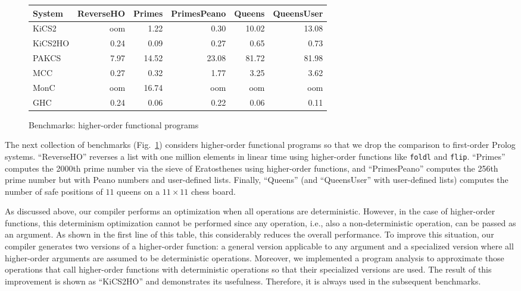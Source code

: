 \documentclass{llncs}
\newcommand{\code}[1]{\mbox{\small\texttt{#1}}}
\begin{document}
\begin{figure}
\centering
\begin{tabular}{|@{~~}l@{~~}|*{5}{@{~~}r@{~~}|}}
\hline
System  & ReverseHO & Primes & PrimesPeano & Queens & QueensUser \\\hline
KiCS2   &      oom  &   1.22 &       0.30  &  10.02 &     13.08  \\
KiCS2HO &     0.24  &   0.09 &       0.27  &   0.65 &      0.73  \\
PAKCS   &     7.97  &  14.52 &      23.08  &  81.72 &     81.98  \\
MCC     &     0.27  &   0.32 &       1.77  &   3.25 &      3.62  \\
MonC    &      oom  &  16.74 &        oom  &    oom &       oom  \\
GHC     &     0.24  &   0.06 &       0.22  &   0.06 &      0.11  \\
\hline
\end{tabular}
\caption{Benchmarks: higher-order functional programs}
 \label{fig:bench-higher-order}
\end{figure}
%
The next collection of benchmarks (Fig.~\ref{fig:bench-higher-order})
considers higher-order functional programs so that we drop
the comparison to first-order Prolog systems.
``ReverseHO'' reverses a list with one million
elements in linear time using higher-order functions
like \code{foldl} and \code{flip}.
``Primes'' computes the 2000th prime number via the
sieve of Eratosthenes using higher-order functions,
and ``PrimesPeano'' computes the 256th prime number but
with Peano numbers and user-defined lists.
Finally, ``Queens'' (and ``QueensUser'' with user-defined lists)
computes the number of safe positions of $11$ queens on a $11 \times 11$
chess board.

As discussed above, our compiler performs an optimization
when all operations are deterministic. However, in the case
of higher-order functions, this determinism optimization cannot be performed
since any operation, i.e., also a non-deterministic operation,
can be passed as an argument. As shown in the first line of this table,
this considerably reduces the overall performance.
To improve this situation, our compiler generates two versions
of a higher-order function: a general version applicable to any
argument and a specialized version where all higher-order arguments
are assumed to be deterministic operations.
Moreover, we implemented a program analysis
to approximate those operations that call higher-order functions
with deterministic operations so that their specialized versions
are used. The result of this improvement
is shown as ``KiCS2HO'' and demonstrates its usefulness.
Therefore, it is always used in the subsequent benchmarks.
\end{document}
